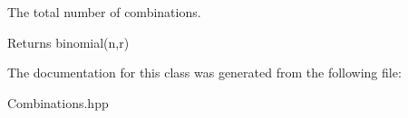 The total number of combinations. 

\begin{DoxyReturn}{Returns}
binomial(n,r) 
\end{DoxyReturn}


The documentation for this class was generated from the following file\-:\begin{DoxyCompactItemize}
\item 
Combinations.\-hpp\end{DoxyCompactItemize}
